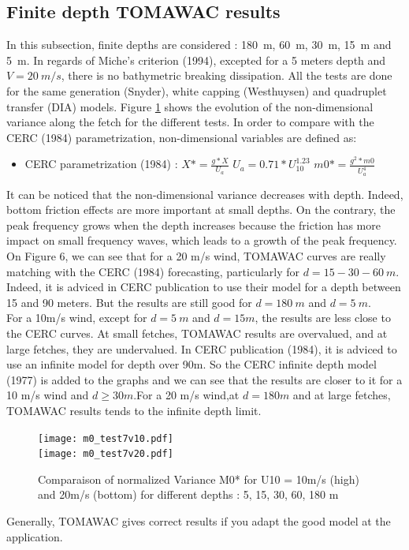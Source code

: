 \subsection{Finite depth TOMAWAC results}
In this subsection, finite depths are considered : 180~m, 60~m, 30~m, 15~m and 5~m. In regards of Miche's criterion (1994), excepted for a 5 meters depth and $V = 20~m/s$, there is no bathymetric breaking dissipation. All the tests are done for the same generation (Snyder), white capping (Westhuysen) and quadruplet transfer (DIA) models. Figure \ref{variancem0} shows the evolution of the non-dimensional variance along the fetch for the different tests. In order to compare with the CERC (1984) parametrization, non-dimensional variables are defined as:\\
\begin{itemize}
\item CERC parametrization (1984) :
\subitem $X* = \frac{g*X}{U_a}$
\subitem $U_a = 0.71*U_{10}^{1.23}$
\subitem $m0* = \frac{g^2*m0}{U_a^4}$
\end{itemize}
It can be noticed that the non-dimensional variance decreases with depth. Indeed, bottom friction effects are more important at small depths. On the contrary, the peak frequency grows when the depth increases because the friction has more impact on small frequency waves, which leads to a growth of the peak frequency.\\
On Figure 6, we can see that for a 20 m/s wind, TOMAWAC curves are really matching with the CERC (1984) forecasting, particularly for $d = 15 - 30 - 60~m$. Indeed, it is adviced in CERC publication to use their model for a depth between 15 and 90 meters. But the results are still good for $d = 180~m$ and $d = 5~m$.\\
For a 10m/s wind, except for $d = 5~m $ and $d = 15 m$, the results are less close to the CERC curves. At small fetches, TOMAWAC results are overvalued, and at large fetches, they are undervalued. In CERC publication (1984), it is adviced to use an infinite model for depth over 90m. So the CERC infinite depth model (1977) is added to the graphs and we can see that the results are closer to it for a 10 m/s wind and $d \geq 30m$.For a 20 m/s wind,at $d = 180m$ and at large fetches, TOMAWAC results tends to the infinite depth limit.
\begin{figure}
\centering
\texttt{[image: m0\_test7v10.pdf]}\\
\texttt{[image: m0\_test7v20.pdf]}\\
\caption{Comparaison of normalized Variance M0* for U10 = 10m/s (high) and 20m/s (bottom) for different depths : 5, 15, 30, 60, 180 m}
\label{variancem0}
\end{figure}
Generally, TOMAWAC gives correct results if you adapt the good model at the application.
